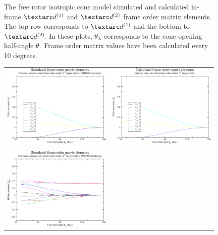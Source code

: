 \begin{figure}
\begin{tabular}{@{}cc@{}}
  \end{tabular}
  \caption[Free-rotor isotropic cone simulated and calculated in-frame Daeg$^{(1)}$ and Daeg$^{(2)}$ elements.]{
    The free rotor isotropic cone model simulated and calculated in-frame $\FOone$ and $\FOtwo$ frame order matrix elements.
    The top row corresponds to $\FOone$ and the bottom to $\FOtwo$.
    In these plots, $\theta_\textrm{X}$ corresponds to the cone opening half-angle $\theta$.
    Frame order matrix values have been calculated every 10 degrees.
  }
  \label{fig: simulated and calculated in-frame 1st and 2nd degree iso cone, free rotor frame order}
\end{figure}

\begin{figure}
\centering
  \begin{tabular}{@{}cc@{}}
    \includegraphics[width=.5\textwidth]{images/frame_order_matrix/Sij_iso_cone_free_rotor_out_of_frame_theta_x_ens1000000.eps} &
    \includegraphics[width=.5\textwidth]{images/frame_order_matrix/Sij_iso_cone_free_rotor_out_of_frame_theta_x_calc.eps} \\
    \\[-5pt]
    \includegraphics[width=.5\textwidth]{images/frame_order_matrix/Sijkl_iso_cone_free_rotor_out_of_frame_theta_x_ens1000000.eps} &

\end{tabular}
\end{figure}
